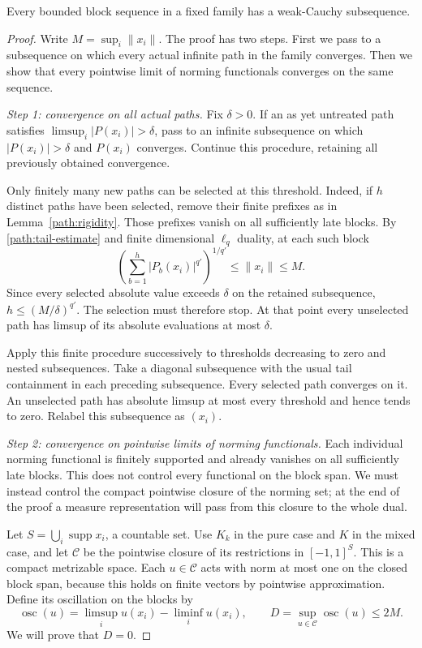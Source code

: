 \begin{proposition}
\label{path:weak-cauchy}\label{path:cauchy}
Every bounded block sequence in a fixed family has a weak-Cauchy
subsequence.
\end{proposition}

\begin{proof}
Write $M=\sup_i\|x_i\|$.  The proof has two steps.  First we pass to a
subsequence on which every actual infinite path in the family
converges.  Then we show that every pointwise limit of norming
functionals converges on the same sequence.

\smallskip\noindent
\emph{Step 1: convergence on all actual paths.}
Fix $\delta>0$.  If an as yet untreated path satisfies
$\limsup_i|P(x_i)|>\delta$, pass to an infinite subsequence on which
$|P(x_i)|>\delta$ and $P(x_i)$ converges.  Continue this procedure,
retaining all previously obtained convergence.

Only finitely many new paths can be selected at this threshold.
Indeed, if $h$ distinct paths have been selected, remove their finite
prefixes as in Lemma~\ref{path:rigidity}.  Those prefixes vanish on all
sufficiently late blocks.  By \eqref{path:tail-estimate} and finite
dimensional $\ell_q$ duality, at each such block
\[
 \left(\sum_{b=1}^{h}|P_b(x_i)|^{q'}\right)^{1/q'}
 \le\|x_i\|\le M.
\]
Since every selected absolute value exceeds $\delta$ on the retained
subsequence, $h\le(M/\delta)^{q'}$.  The selection must therefore stop.
At that point every unselected path has limsup of its absolute
evaluations at most $\delta$.

Apply this finite procedure successively to thresholds decreasing to
zero and nested subsequences.  Take a diagonal subsequence with the
usual tail containment in each preceding subsequence.  Every selected
path converges on it.  An unselected path has absolute limsup at most
every threshold and hence tends to zero.  Relabel this subsequence as
$(x_i)$.

\smallskip\noindent
\emph{Step 2: convergence on pointwise limits of norming functionals.}
Each individual norming functional is finitely supported and already
vanishes on all sufficiently late blocks. This does not control every
functional on the block span. We must instead control the compact
pointwise closure of the norming set; at the end of the proof a measure
representation will pass from this closure to the whole dual.

Let $S=\bigcup_i\operatorname{supp}x_i$, a countable set.  Use $K_k$ in
the pure case and $K$ in the mixed case, and let $\mathcal C$ be the
pointwise closure of its restrictions in $[-1,1]^S$.  This is a compact
metrizable space.  Each $u\in\mathcal C$ acts with norm at most one on
the closed block span, because this holds on finite vectors by
pointwise approximation.  Define its oscillation on the blocks by
\[
 \operatorname{osc}(u)
 =\limsup_i u(x_i)-\liminf_i u(x_i),\qquad
 D=\sup_{u\in\mathcal C}\operatorname{osc}(u)\le2M.
\]
We will prove that $D=0$.


\end{proof}
